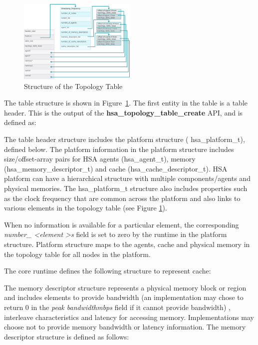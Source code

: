 \documentclass{book}
\newcommand{\reffun}[1]{\textbf{#1}}
\newcommand{\reftyp}[1]{#1}
\begin{document}


\begin{figure}[b]
  \centering
  \includegraphics[width=0.5\textwidth]{fig/topologytable}
  \centering
  \caption{Structure of the Topology Table}
  \label{fig:topology_table}
\end{figure}

The table structure is shown in Figure~\ref{fig:topology_table}.
The first entity in the table is a table header. This is the output
of the \reffun{hsa\_topology\_table\_create} API, and is defined as:


The table header structure includes the platform structure (
\reftyp{hsa\_platform\_t}), defined below.  The platform information in
the platform structure includes size/offset-array pairs for HSA agents
(\reftyp{hsa\_agent\_t}), memory (\reftyp{hsa\_memory\_descriptor\_t}) and
cache (\reftyp{hsa\_cache\_descriptor\_t}).  HSA platform can have a
hierarchical structure with multiple components/agents and physical
memories.  The \reftyp{hsa\_platform\_t} structure also includes
properties such as the clock frequency that are common across the
platform and also links to various elements in the topology table (see
Figure \ref{fig:topology_table}).



When no information is available for a particular element, the
corresponding {\itshape number\_ \textless element \textgreater s}
field is set to zero by the runtime in the platform structure.
Platform structure maps to the agents, cache and physical memory
in the topology table for all nodes in the platform.

The core runtime defines the following structure to represent cache:


The memory descriptor structure represents a physical memory block or
region and includes elements to provide bandwidth (an implementation
may chose to return 0 in the {\itshape peak\textunderscore
  bandwidth\textunderscore mbps} field if it cannot provide bandwidth)
, interleave characteristics and latency for accessing
memory. Implementations may choose not to provide memory bandwidth or
latency information.  The memory descriptor structure is defined as
follows:

\end{document}
